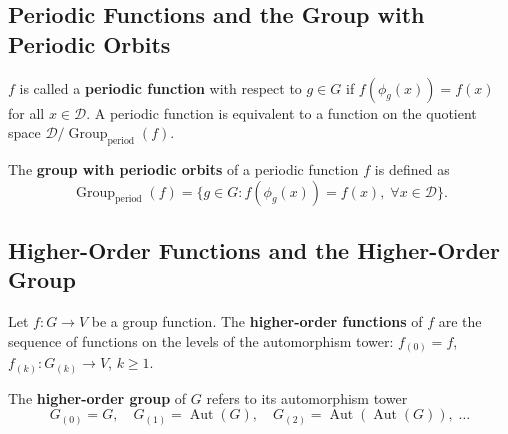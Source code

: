 \subsection{\texorpdfstring{Periodic Functions and the Group with Periodic Orbits}{Periodic Functions and the Group with Periodic Orbits}}

\begin{definition}\label{def:periodic_function_gf}
$f$ is called a \textbf{periodic function} with respect to $g \in G$ if $f(\phi_g(x)) = f(x)$ for all $x \in \mathcal{D}$. A periodic function is equivalent to a function on the quotient space $\mathcal{D}/\operatorname{Group}_{\mathrm{period}}(f)$.
\end{definition}

\begin{definition}\label{def:group_with_periodic_orbits_gf}
The \textbf{group with periodic orbits} of a periodic function $f$ is defined as
\[
\operatorname{Group}_{\mathrm{period}}(f) = \{g \in G : f(\phi_g(x)) = f(x),\; \forall x \in \mathcal{D}\}.
\]
\end{definition}

\subsection{\texorpdfstring{Higher-Order Functions and the Higher-Order Group}{Higher-Order Functions and the Higher-Order Group}}

\begin{definition}\label{def:higher_function_gf}
Let $f: G \to V$ be a group function. The \textbf{higher-order functions} of $f$ are the sequence of functions on the levels of the automorphism tower: $f_{(0)} = f$, $f_{(k)}: G_{(k)} \to V$, $k \ge 1$.
\end{definition}

\begin{definition}
\label{def:higher_group_gf}
The \textbf{higher-order group} of $G$ refers to its automorphism tower
\[
G_{(0)} = G,\quad
G_{(1)} = \operatorname{Aut}(G),\quad
G_{(2)} = \operatorname{Aut}(\operatorname{Aut}(G)),\;\dots
\]
\end{definition}

